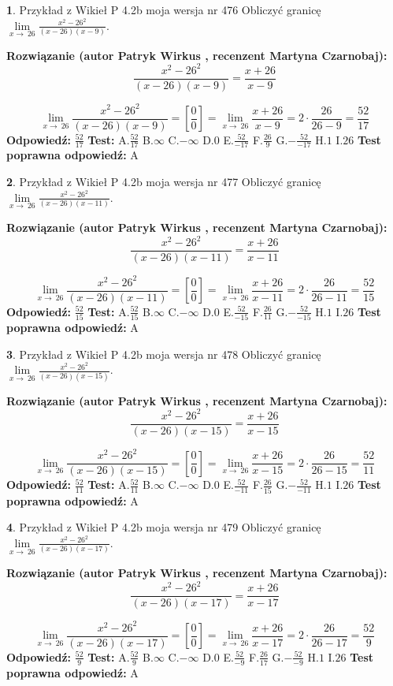 \documentclass[12pt, a4paper]{article}
\theoremstyle{definition} %
\newtheorem{zad}{}
\newcommand{\zadStart}[1]{\begin{zad}#1\newline}
\newcommand{\zadStop}{\end{zad}}
\newcommand{\rozwStart}[2]{\noindent \textbf{Rozwiązanie (autor #1 , recenzent #2): }\newline}
\newcommand{\rozwStop}{\newline}
\newcommand{\odpStart}{\noindent \textbf{Odpowiedź:}\newline}
\newcommand{\odpStop}{\newline}
\newcommand{\testStart}{\noindent \textbf{Test:}\newline}
\newcommand{\testStop}{\newline}
\newcommand{\kluczStart}{\noindent \textbf{Test poprawna odpowiedź:}\newline}
\newcommand{\kluczStop}{\newline}
\begin{document}
\zadStart{Przykład z Wikieł P 4.2b moja wersja nr 476}
Obliczyć granicę $\lim\limits_{x\to\ 26}\frac{x^{2}-26^{2}}{(x-26)(x-9)}$.
\zadStop
\rozwStart{Patryk Wirkus}{Martyna Czarnobaj}
$$\frac{x^{2}-26^{2}}{(x-26)(x-9)}=\frac{x+26}{x-9}$$

$$\lim\limits_{x\to\ 26}\frac{x^{2}-26^{2}}{(x-26)(x-9)}=[\frac{0}{0}]=\lim\limits_{x\to\ 26}\frac{x+26}{x-9}=2 \cdot \frac{26}{26-9} = \frac{52}{17}$$
\rozwStop
\odpStart
$\frac{52}{17}$
\odpStop
\testStart
A.$\frac{52}{17}$
B.$\infty$
C.$-\infty$
D.$0$
E.$\frac{52}{-17}$
F.$\frac{26}{9}$
G.$-\frac{52}{-17}$
H.$1$
I.$26$
\testStop
\kluczStart
A
\kluczStop



\zadStart{Przykład z Wikieł P 4.2b moja wersja nr 477}
Obliczyć granicę $\lim\limits_{x\to\ 26}\frac{x^{2}-26^{2}}{(x-26)(x-11)}$.
\zadStop
\rozwStart{Patryk Wirkus}{Martyna Czarnobaj}
$$\frac{x^{2}-26^{2}}{(x-26)(x-11)}=\frac{x+26}{x-11}$$

$$\lim\limits_{x\to\ 26}\frac{x^{2}-26^{2}}{(x-26)(x-11)}=[\frac{0}{0}]=\lim\limits_{x\to\ 26}\frac{x+26}{x-11}=2 \cdot \frac{26}{26-11} = \frac{52}{15}$$
\rozwStop
\odpStart
$\frac{52}{15}$
\odpStop
\testStart
A.$\frac{52}{15}$
B.$\infty$
C.$-\infty$
D.$0$
E.$\frac{52}{-15}$
F.$\frac{26}{11}$
G.$-\frac{52}{-15}$
H.$1$
I.$26$
\testStop
\kluczStart
A
\kluczStop



\zadStart{Przykład z Wikieł P 4.2b moja wersja nr 478}
Obliczyć granicę $\lim\limits_{x\to\ 26}\frac{x^{2}-26^{2}}{(x-26)(x-15)}$.
\zadStop
\rozwStart{Patryk Wirkus}{Martyna Czarnobaj}
$$\frac{x^{2}-26^{2}}{(x-26)(x-15)}=\frac{x+26}{x-15}$$

$$\lim\limits_{x\to\ 26}\frac{x^{2}-26^{2}}{(x-26)(x-15)}=[\frac{0}{0}]=\lim\limits_{x\to\ 26}\frac{x+26}{x-15}=2 \cdot \frac{26}{26-15} = \frac{52}{11}$$
\rozwStop
\odpStart
$\frac{52}{11}$
\odpStop
\testStart
A.$\frac{52}{11}$
B.$\infty$
C.$-\infty$
D.$0$
E.$\frac{52}{-11}$
F.$\frac{26}{15}$
G.$-\frac{52}{-11}$
H.$1$
I.$26$
\testStop
\kluczStart
A
\kluczStop



\zadStart{Przykład z Wikieł P 4.2b moja wersja nr 479}
Obliczyć granicę $\lim\limits_{x\to\ 26}\frac{x^{2}-26^{2}}{(x-26)(x-17)}$.
\zadStop
\rozwStart{Patryk Wirkus}{Martyna Czarnobaj}
$$\frac{x^{2}-26^{2}}{(x-26)(x-17)}=\frac{x+26}{x-17}$$

$$\lim\limits_{x\to\ 26}\frac{x^{2}-26^{2}}{(x-26)(x-17)}=[\frac{0}{0}]=\lim\limits_{x\to\ 26}\frac{x+26}{x-17}=2 \cdot \frac{26}{26-17} = \frac{52}{9}$$
\rozwStop
\odpStart
$\frac{52}{9}$
\odpStop
\testStart
A.$\frac{52}{9}$
B.$\infty$
C.$-\infty$
D.$0$
E.$\frac{52}{-9}$
F.$\frac{26}{17}$
G.$-\frac{52}{-9}$
H.$1$
I.$26$
\testStop
\kluczStart
A
\kluczStop
\end{document}
